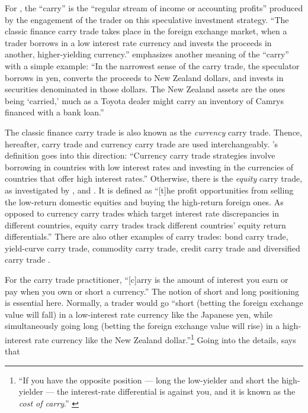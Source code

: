 \documentclass[a4paper, twoside]{templates/ociamthesis}
\begin{document}
For \textcite[ 6]{lee2020}, the ``carry'' is the ``regular stream of income or accounting profits'' produced by the engagement of the trader on this speculative investment strategy. ``The classic finance carry trade takes place in the foreign exchange market, when a trader borrows in a low interest rate currency and invests the proceeds in another, higher-yielding currency.'' \autocite[ 6]{lee2020} \textcite[ 40]{frankel2008} emphasizes another meaning of the ``carry'' with a simple example: ``In the narrowest sense of the carry trade, the speculator borrows in yen, converts the proceeds to New Zealand dollars, and invests in securities denominated in those dollars. The New Zealand assets are the ones being `carried,' much as a Toyota dealer might carry an inventory of Camrys ﬁnanced with a bank loan.''

The classic finance carry trade is also known as the \emph{currency} carry trade. Thence, hereafter, carry trade and currency carry trade are used interchangeably. \textcite[ 139]{bakshi2013}'s definition goes into this direction: ``Currency carry trade strategies involve borrowing in countries with low interest rates and investing in the currencies of countries that offer high interest rates.'' Otherwise, there is the \emph{equity} carry trade, as investigated by \textcite{cenedese2016}, \textcite{koijen2018} and \textcite{girardin2019}. It is defined as ``{[}t{]}he profit opportunities from selling the low-return domestic equities and buying the high-return foreign ones. As opposed to currency carry trades which target interest rate discrepancies in different countries, equity carry trades track different countries' equity return differentials.'' \autocite[ 422]{girardin2019} There are also other examples of carry trades: bond carry trade, yield-curve carry trade, commodity carry trade, credit carry trade and diversified carry trade \autocite[ 187-188]{pedersen2015}.

For the carry trade practitioner, ``{[}c{]}arry is the amount of interest you earn or pay when you own or short a currency.'' \autocite[ 42]{donnelly2019} The notion of short and long positioning is essential here. Normally, a trader would go ``short (betting the foreign exchange value will fall) in a low-interest rate currency like the Japanese yen, while simultaneously going long (betting the foreign exchange value will rise) in a high-interest rate currency like the New Zealand dollar.''\footnote{``If you have the opposite position --- long the low-yielder and short the high-yielder --- the interest-rate differential is against you, and it is known as the \emph{cost of carry}.'' \autocite[ 191]{brooks2015}} \autocite[ 40]{frankel2008} Going into the details, \textcite[ 20]{donnelly2019} says that
\end{document}
